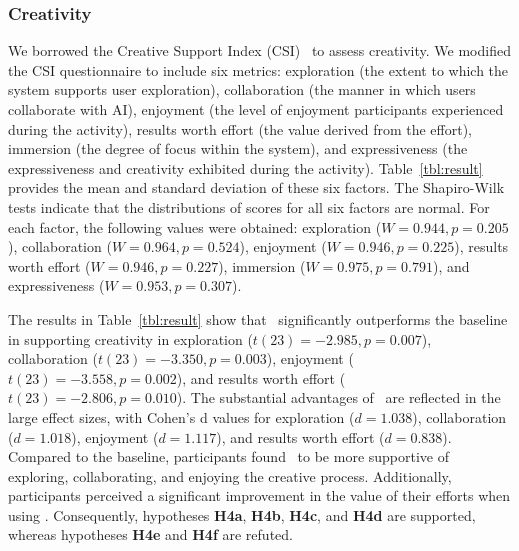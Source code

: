 \subsubsection{Creativity}



We borrowed the Creative Support Index (CSI)~\cite{10.1145/2617588} to assess creativity. 
We modified the CSI questionnaire to include six metrics: 
exploration (the extent to which the system supports user exploration), 
collaboration (the manner in which users collaborate with AI), 
enjoyment (the level of enjoyment participants experienced during the activity), 
results worth effort (the value derived from the effort), 
immersion (the degree of focus within the system), and 
expressiveness (the expressiveness and creativity exhibited during the activity).
Table~\ref{tbl:result} provides the mean and standard deviation of these six factors.
The Shapiro-Wilk tests indicate that the distributions of scores for all six factors are normal. 
For each factor, the following values were obtained: exploration ($W = 0.944, p = 0.205$), collaboration ($W = 0.964, p = 0.524$), enjoyment ($W = 0.946, p = 0.225$), results worth effort ($W = 0.946, p = 0.227$), immersion ($W = 0.975, p = 0.791$), and expressiveness ($W = 0.953, p = 0.307$).


The results in Table~\ref{tbl:result} show that \sysname\ significantly outperforms the baseline in supporting creativity in exploration ($t(23) = -2.985, p = 0.007$), collaboration ($t(23) = -3.350, p = 0.003$), enjoyment ($t(23) = -3.558, p = 0.002$), and results worth effort ($t(23) = -2.806, p = 0.010$). 
The substantial advantages of \sysname\ are reflected in the large effect sizes, with Cohen's d values for exploration ($d = 1.038$), collaboration ($d = 1.018$), enjoyment ($d = 1.117$), and results worth effort ($d = 0.838$).
Compared to the baseline, participants found \sysname\ to be more supportive of exploring, collaborating, and enjoying the creative process. Additionally, participants perceived a significant improvement in the value of their efforts when using \sysname.
Consequently, hypotheses \textbf{H4a}, \textbf{H4b}, \textbf{H4c}, and \textbf{H4d} are supported, whereas hypotheses \textbf{H4e} and \textbf{H4f} are refuted.



